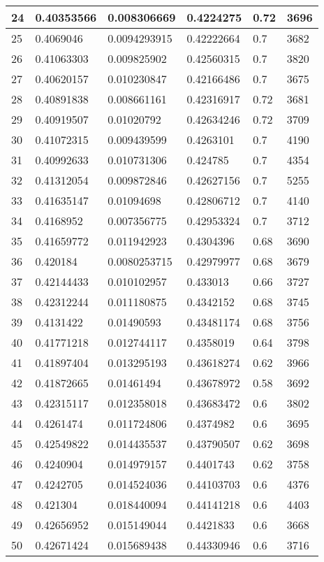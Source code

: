 \begin{longtable}{|l|l|l|l|l|l|}
24 & 0.40353566 & 0.008306669 & 0.4224275 & 0.72 & 3696 \\ \hline 
25 & 0.4069046 & 0.0094293915 & 0.42222664 & 0.7 & 3682 \\ \hline 
26 & 0.41063303 & 0.009825902 & 0.42560315 & 0.7 & 3820 \\ \hline 
27 & 0.40620157 & 0.010230847 & 0.42166486 & 0.7 & 3675 \\ \hline 
28 & 0.40891838 & 0.008661161 & 0.42316917 & 0.72 & 3681 \\ \hline 
29 & 0.40919507 & 0.01020792 & 0.42634246 & 0.72 & 3709 \\ \hline 
30 & 0.41072315 & 0.009439599 & 0.4263101 & 0.7 & 4190 \\ \hline 
31 & 0.40992633 & 0.010731306 & 0.424785 & 0.7 & 4354 \\ \hline 
32 & 0.41312054 & 0.009872846 & 0.42627156 & 0.7 & 5255 \\ \hline 
33 & 0.41635147 & 0.01094698 & 0.42806712 & 0.7 & 4140 \\ \hline 
34 & 0.4168952 & 0.007356775 & 0.42953324 & 0.7 & 3712 \\ \hline 
35 & 0.41659772 & 0.011942923 & 0.4304396 & 0.68 & 3690 \\ \hline 
36 & 0.420184 & 0.0080253715 & 0.42979977 & 0.68 & 3679 \\ \hline 
37 & 0.42144433 & 0.010102957 & 0.433013 & 0.66 & 3727 \\ \hline 
38 & 0.42312244 & 0.011180875 & 0.4342152 & 0.68 & 3745 \\ \hline 
39 & 0.4131422 & 0.01490593 & 0.43481174 & 0.68 & 3756 \\ \hline 
40 & 0.41771218 & 0.012744117 & 0.4358019 & 0.64 & 3798 \\ \hline 
41 & 0.41897404 & 0.013295193 & 0.43618274 & 0.62 & 3966 \\ \hline 
42 & 0.41872665 & 0.01461494 & 0.43678972 & 0.58 & 3692 \\ \hline 
43 & 0.42315117 & 0.012358018 & 0.43683472 & 0.6 & 3802 \\ \hline 
44 & 0.4261474 & 0.011724806 & 0.4374982 & 0.6 & 3695 \\ \hline 
45 & 0.42549822 & 0.014435537 & 0.43790507 & 0.62 & 3698 \\ \hline 
46 & 0.4240904 & 0.014979157 & 0.4401743 & 0.62 & 3758 \\ \hline 
47 & 0.4242705 & 0.014524036 & 0.44103703 & 0.6 & 4376 \\ \hline 
48 & 0.421304 & 0.018440094 & 0.44141218 & 0.6 & 4403 \\ \hline 
49 & 0.42656952 & 0.015149044 & 0.4421833 & 0.6 & 3668 \\ \hline 
50 & 0.42671424 & 0.015689438 & 0.44330946 & 0.6 & 3716 \\ \hline 
\end{longtable}